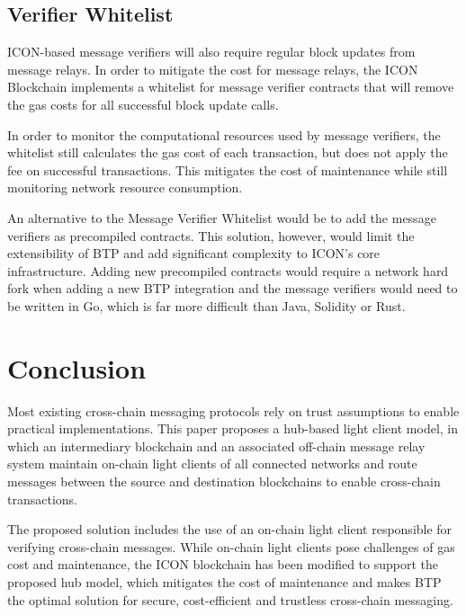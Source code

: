 \documentclass{article}
\begin{document}
\subsection{Verifier Whitelist}
ICON-based message verifiers will also require regular block updates from message relays. In order to mitigate the cost for message relays, the ICON Blockchain implements a whitelist for message verifier contracts that will remove the gas costs for all successful block update calls.

In order to monitor the computational resources used by message verifiers, the whitelist still calculates the gas cost of each transaction, but does not apply the fee on successful transactions. This mitigates the cost of maintenance while still monitoring network resource consumption.

An alternative to the Message Verifier Whitelist would be to add the message verifiers as precompiled contracts. This solution, however, would limit the extensibility of BTP and add significant complexity to ICON’s core infrastructure. Adding new precompiled contracts would require a network hard fork when adding a new BTP integration and the message verifiers would need to be written in Go, which is far more difficult than Java, Solidity or Rust.

\section{Conclusion}

Most existing cross-chain messaging protocols rely on trust assumptions to enable practical implementations. This paper proposes a hub-based light client model, in which an intermediary blockchain and an associated off-chain message relay system maintain on-chain light clients of all connected networks and route messages between the source and destination blockchains to enable cross-chain transactions. 

The proposed solution includes the use of an on-chain light client responsible for verifying cross-chain messages. While on-chain light clients pose challenges of gas cost and maintenance, the ICON blockchain has been modified to support the proposed hub model, which mitigates the cost of maintenance and makes BTP the optimal solution for secure, cost-efficient and trustless cross-chain messaging. \\
\end{document}
